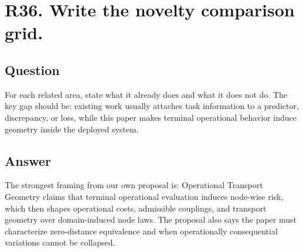 \documentclass[11pt,a4paper]{article}
\begin{document}
\section*{R36. Write the novelty comparison grid.}

\subsection*{Question}

For each related area, state what it already does and what it does not do. The key gap should be: existing work usually attaches task information to a predictor, discrepancy, or loss, while this paper makes terminal operational behavior induce geometry inside the deployed system.

\subsection*{Answer}

The strongest framing from our own proposal is: Operational Transport Geometry claims that terminal operational evaluation induces node-wise risk, which then shapes operational costs, admissible couplings, and transport geometry over domain-induced node laws. The proposal also says the paper must characterize zero-distance equivalence and when operationally consequential variations cannot be collapsed.
\end{document}
